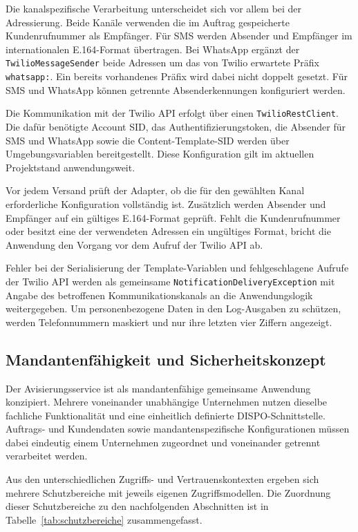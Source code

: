 Die kanalspezifische Verarbeitung unterscheidet sich vor allem
bei der Adressierung. Beide Kanäle verwenden die im Auftrag
gespeicherte Kundenrufnummer als Empfänger. Für SMS werden
Absender und Empfänger im internationalen E.164-Format
übertragen. Bei WhatsApp ergänzt der
\texttt{TwilioMessageSender} beide Adressen um das von Twilio
erwartete Präfix \texttt{whatsapp:}. Ein bereits vorhandenes Präfix
wird dabei nicht doppelt gesetzt. Für SMS und WhatsApp können
getrennte Absenderkennungen konfiguriert werden.

Die Kommunikation mit der Twilio API erfolgt über einen
\texttt{TwilioRestClient}. Die dafür benötigte Account SID,
das Authentifizierungstoken, die Absender für SMS und WhatsApp
sowie die Content-Template-SID werden über Umgebungsvariablen
bereitgestellt. Diese Konfiguration gilt im aktuellen
Projektstand anwendungsweit.

Vor jedem Versand prüft der Adapter, ob die für den gewählten
Kanal erforderliche Konfiguration vollständig ist. Zusätzlich
werden Absender und Empfänger auf ein gültiges E.164-Format
geprüft. Fehlt die Kundenrufnummer oder besitzt eine der
verwendeten Adressen ein ungültiges Format, bricht die
Anwendung den Vorgang vor dem Aufruf der Twilio API ab.

Fehler bei der Serialisierung der Template-Variablen und
fehlgeschlagene Aufrufe der Twilio API werden als gemeinsame
\texttt{Notification\allowbreak{}Delivery\allowbreak{}Exception} mit Angabe des
betroffenen Kommunikationskanals an die Anwendungslogik
weitergegeben. Um personenbezogene Daten in den Log-Ausgaben zu schützen, werden
Telefonnummern maskiert und nur ihre letzten vier Ziffern
angezeigt.

\subsection{Mandantenfähigkeit und Sicherheitskonzept}
\label{sec:sicherheitskonzept}

Der Avisierungsservice ist als mandantenfähige gemeinsame Anwendung konzipiert.
Mehrere voneinander unabhängige Unternehmen nutzen dieselbe fachliche
Funktionalität und eine einheitlich definierte DISPO-Schnittstelle. Auftrags-
und Kundendaten sowie mandantenspezifische Konfigurationen müssen dabei
eindeutig einem Unternehmen zugeordnet und voneinander getrennt verarbeitet
werden.

Aus den unterschiedlichen Zugriffs- und Vertrauenskontexten ergeben sich mehrere
Schutzbereiche mit jeweils eigenen Zugriffsmodellen. Die Zuordnung dieser
Schutzbereiche zu den nachfolgenden Abschnitten ist in
Tabelle~\ref{tab:schutzbereiche} zusammengefasst.

